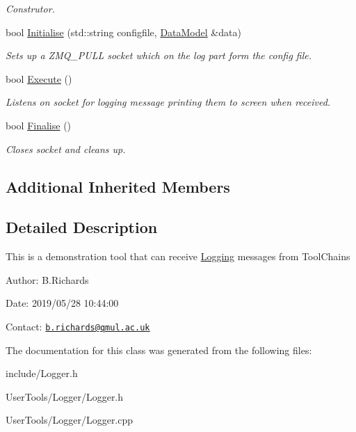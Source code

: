 \begin{DoxyCompactItemize}
\begin{DoxyCompactList}\small\item\em Construtor. \end{DoxyCompactList}\item 
\hypertarget{classLogger_a1b598f35f454e24f9e9abc9f18c3e98f}{bool \hyperlink{classLogger_a1b598f35f454e24f9e9abc9f18c3e98f}{Initialise} (std\-::string configfile, \hyperlink{classDataModel}{Data\-Model} \&data)}\label{classLogger_a1b598f35f454e24f9e9abc9f18c3e98f}

\begin{DoxyCompactList}\small\item\em Sets up a Z\-M\-Q\-\_\-\-P\-U\-L\-L socket which on the log part form the config file. \end{DoxyCompactList}\item 
\hypertarget{classLogger_a140ebede2975159a5abe7c59e56ec0ec}{bool \hyperlink{classLogger_a140ebede2975159a5abe7c59e56ec0ec}{Execute} ()}\label{classLogger_a140ebede2975159a5abe7c59e56ec0ec}

\begin{DoxyCompactList}\small\item\em Listens on socket for logging message printing them to screen when received. \end{DoxyCompactList}\item 
\hypertarget{classLogger_a2c70367a86d5999db21324ccb58f44ed}{bool \hyperlink{classLogger_a2c70367a86d5999db21324ccb58f44ed}{Finalise} ()}\label{classLogger_a2c70367a86d5999db21324ccb58f44ed}

\begin{DoxyCompactList}\small\item\em Closes socket and cleans up. \end{DoxyCompactList}\end{DoxyCompactItemize}
\subsection*{Additional Inherited Members}


\subsection{Detailed Description}
This is a demonstration tool that can receive \hyperlink{classLogging}{Logging} messages from Tool\-Chains

\begin{DoxyParagraph}{Author\-:}
B.\-Richards 
\end{DoxyParagraph}
\begin{DoxyParagraph}{Date\-:}
2019/05/28 10\-:44\-:00 
\end{DoxyParagraph}
Contact\-: \href{mailto:b.richards@qmul.ac.uk}{\tt b.\-richards@qmul.\-ac.\-uk} 

The documentation for this class was generated from the following files\-:\begin{DoxyCompactItemize}
\item 
include/Logger.\-h\item 
User\-Tools/\-Logger/Logger.\-h\item 
User\-Tools/\-Logger/Logger.\-cpp\end{DoxyCompactItemize}
